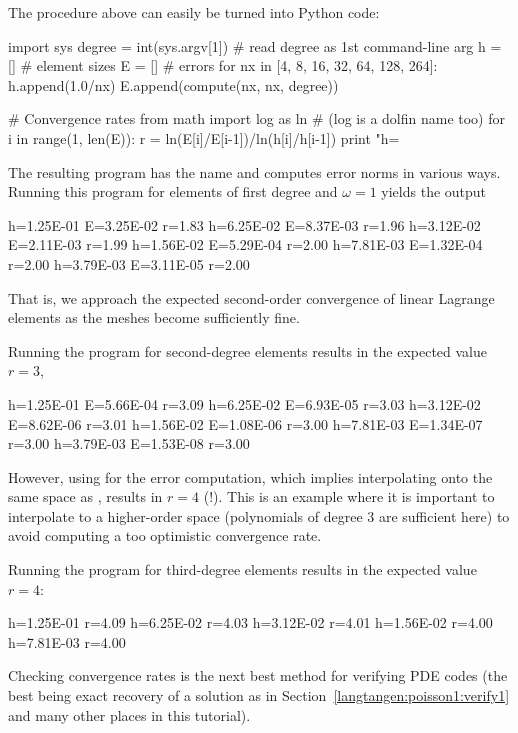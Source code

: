 The procedure above can easily be turned into Python code:
\begin{python}
import sys
degree = int(sys.argv[1])  # read degree as 1st command-line arg
h = []  # element sizes
E = []  # errors
for nx in [4, 8, 16, 32, 64, 128, 264]:
    h.append(1.0/nx)
    E.append(compute(nx, nx, degree))

# Convergence rates
from math import log as ln  # (log is a dolfin name too)
for i in range(1, len(E)):
    r = ln(E[i]/E[i-1])/ln(h[i]/h[i-1])
    print "h=%
\end{python}
The resulting program has the name  and computes
error norms in various ways. Running this program for elements of first
degree and $\omega=1$ yields the output
\begin{progoutput}
h=1.25E-01 E=3.25E-02 r=1.83
h=6.25E-02 E=8.37E-03 r=1.96
h=3.12E-02 E=2.11E-03 r=1.99
h=1.56E-02 E=5.29E-04 r=2.00
h=7.81E-03 E=1.32E-04 r=2.00
h=3.79E-03 E=3.11E-05 r=2.00
\end{progoutput}
\noindent
That is, we approach the expected second-order convergence of linear
Lagrange elements as the meshes become sufficiently fine.

Running the program for second-degree elements results in the expected
value $r=3$,
\begin{progoutput}
h=1.25E-01 E=5.66E-04 r=3.09
h=6.25E-02 E=6.93E-05 r=3.03
h=3.12E-02 E=8.62E-06 r=3.01
h=1.56E-02 E=1.08E-06 r=3.00
h=7.81E-03 E=1.34E-07 r=3.00
h=3.79E-03 E=1.53E-08 r=3.00
\end{progoutput}
\noindent
However, using  for the error computation, which
implies interpolating  onto the same space as ,
results in $r=4$ (!). This is an example where it is important to
interpolate  to a higher-order space (polynomials of
degree 3 are sufficient here) to avoid computing a too optimistic
convergence rate.

Running the program for third-degree elements results in the expected
value~$r=4$:
\begin{progoutput}
h=1.25E-01 r=4.09
h=6.25E-02 r=4.03
h=3.12E-02 r=4.01
h=1.56E-02 r=4.00
h=7.81E-03 r=4.00
\end{progoutput}
\noindent
Checking convergence rates is the next best method for verifying
PDE codes (the best being exact recovery of a solution as in
Section~\ref{langtangen:poisson1:verify1} and many other places in
this tutorial).

